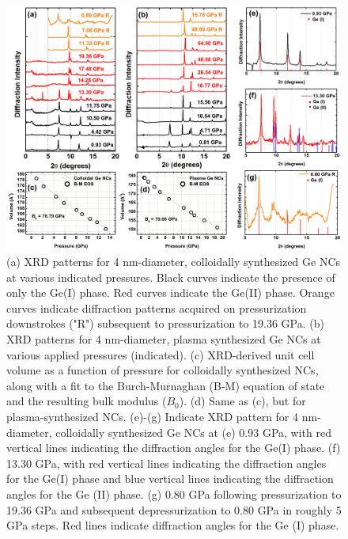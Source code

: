 \begin{figure}
\begin{center}
\includegraphics[width=\textwidth]{./chapter7/gepressure1.png}
\caption[Pressure-dependent XRD patterns for Ge NCs, phase analysis, and related XRD-derived structural data.]{(a) XRD patterns for 4 nm-diameter, colloidally synthesized Ge NCs at various indicated pressures.  Black curves indicate the presence of only the Ge(I) phase.  Red curves indicate the Ge(II) phase.  Orange curves indicate diffraction patterns acquired on pressurization downstrokes ("R") subsequent to pressurization to 19.36 GPa.  (b) XRD patterns for 4 nm-diameter, plasma synthesized Ge NCs at various applied pressures (indicated).  (c) XRD-derived unit cell volume as a function of pressure for colloidally synthesized NCs, along with a fit to the Burch-Murnaghan (B-M) equation of state and the resulting bulk modulus ($B_0$). (d) Same as (c), but for plasma-synthesized NCs. (e)-(g) Indicate XRD pattern for 4 nm-diameter, colloidally synthesized Ge NCs at (e) 0.93 GPa, with red vertical lines indicating the diffraction angles for the Ge(I) phase.  (f) 13.30 GPa, with red vertical lines indicating the diffraction angles for the Ge(I) phase and blue vertical lines indicating the diffraction angles for the Ge (II) phase.  (g) 0.80 GPa following pressurization to 19.36 GPa and subsequent depressurization to 0.80 GPa in roughly 5 GPa steps.  Red lines indicate diffraction angles for the Ge (I) phase.}
\label{f:gepressure1}
\end{center}
\end{figure}

